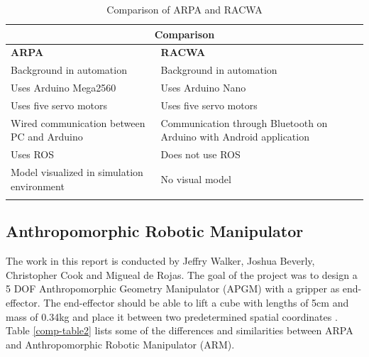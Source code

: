 \documentclass[11pt,a4paper, titlepage]{article}
\begin{document}
\begin{center}           
    \begin{longtable}{| p{8cm} | p{8cm} |}
              \hline
                       
\multicolumn{2}{|c|}{\textbf{Comparison}} \\ \hline \endhead
\textbf{ARPA} & \textbf{RACWA}  \\ \hline             
               Background in automation & Background in automation  \\ \hline
               Uses Arduino Mega2560 & Uses Arduino Nano  \\ \hline
               Uses five servo motors & Uses five servo motors \\ \hline
               Wired communication between PC and Arduino  & Communication through Bluetooth on Arduino with Android application \\ \hline
               Uses ROS & Does not use ROS \\ \hline
               Model visualized in simulation environment & No visual model \\ \hline
               
\caption{Comparison of ARPA and RACWA}
\label{comp-table1}                                       
\end{longtable}
\end{center}


\newpage
\subsection{Anthropomorphic Robotic Manipulator}
The work in this report is conducted by Jeffry Walker, Joshua Beverly, Christopher Cook and Migueal de Rojas. The goal of the project was to design a 5 DOF Anthropomorphic Geometry Manipulator (APGM) with a gripper as end-effector. The end-effector should be able to lift a cube with lengths of 5cm and mass of 0.34kg and place it between two predetermined spatial coordinates \cite{walker2012}. Table \ref{comp-table2} lists some of the differences and similarities between ARPA and Anthropomorphic Robotic Manipulator (ARM).
\end{document}

